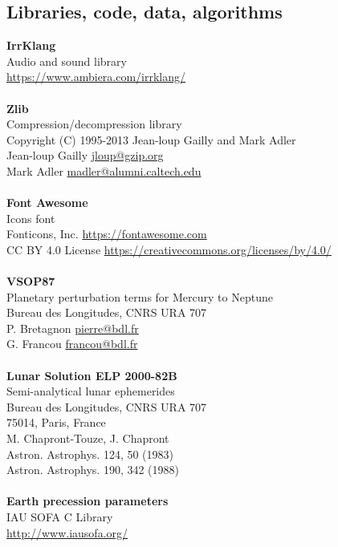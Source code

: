 \documentclass[Orbiter User Manual.tex]{subfiles}
\begin{document}
\subsection{Libraries, code, data, algorithms}
\textbf{IrrKlang}\\
Audio and sound library\\
\url{https://www.ambiera.com/irrklang/}\\
\\
\textbf{Zlib}\\
Compression/decompression library\\
Copyright (C) 1995-2013 Jean-loup Gailly and Mark Adler\\
Jean-loup Gailly \href{mailto:jloup@gzip.org}{jloup@gzip.org}\\
Mark Adler \href{mailto:madler@alumni.caltech.edu}{madler@alumni.caltech.edu}\\
\\
\textbf{Font Awesome}\\
Icons font\\
Fonticons, Inc. \url{https://fontawesome.com}\\
CC BY 4.0 License \url{https://creativecommons.org/licenses/by/4.0/}\\
\\
\textbf{VSOP87}\\
Planetary perturbation terms for Mercury to Neptune\\
Bureau des Longitudes, CNRS URA 707\\
P. Bretagnon \href{mailto:pierre@bdl.fr}{pierre@bdl.fr}\\
G. Francou \href{mailto:francou@bdl.fr}{francou@bdl.fr}\\
\\
\textbf{Lunar Solution ELP 2000-82B}\\
Semi-analytical lunar ephemerides\\
Bureau des Longitudes, CNRS URA 707\\
75014, Paris, France\\
M. Chapront-Touze, J. Chapront\\
Astron. Astrophys. 124, 50 (1983)\\
Astron. Astrophys. 190, 342 (1988)\\
\\
\textbf{Earth precession parameters}\\
IAU SOFA C Library\\
\url{http://www.iausofa.org/}\\
\\
\end{document}
